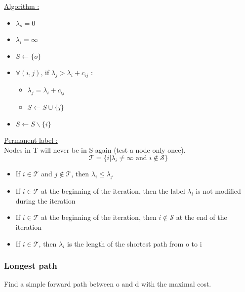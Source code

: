 \documentclass[../main.tex]{subfiles}
\begin{document}
\underline{Algorithm :}\\
\begin{itemize}
    \item $\lambda_o = 0$\\
    \item $\lambda_i = \infty$\\
    \item $S\leftarrow \{o\}$\\
    \item $\forall (i,j)$, if $\lambda_j > \lambda_i + c_{ij}$ : \begin{itemize}
        \item $\lambda_j = \lambda_i + c_{ij}$\\
        \item $S \leftarrow S\cup \{j\}$\\
    \end{itemize}
    \item $S \leftarrow S\backslash \{i\}$\\
\end{itemize}

\quad \underline{Permanent label :}\\
Nodes in T will never be in S again (test a node only once).\\

\begin{equation}
    \mathcal{T} = \{i \lvert \lambda_i \neq \infty \text{ and } i\notin \mathcal{S}\}
\end{equation}

\begin{itemize}
    \item If $i \in \mathcal{T}$ and $j\notin \mathcal{T}$, then $\lambda_i\leq \lambda_j$\\
    \item If $i \in \mathcal{T}$ at the beginning of the iteration, then the label $\lambda_i$ is not modified during the iteration\\
    \item If $i\in \mathcal{T}$ at the beginning of the iteration, then $i \notin \mathcal{S}$ at the end of the iteration\\
    \item If $i\in \mathcal{T}$, then $\lambda_i$ is the length of the shortest path from o to i\\
\end{itemize}

\subsubsection{Longest path}
Find a simple forward path between o and d with the maximal cost.\\
\end{document}
